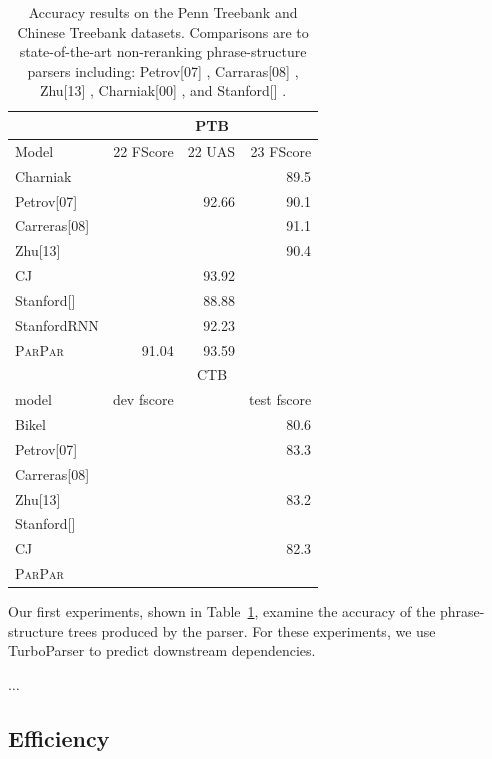 \documentclass[11pt,letterpaper]{article}
\newcommand{\ParseName}{\textsc{ParPar}}
\begin{document}
\begin{table}
  \centering
  \small
  \begin{tabular}{|l|rrr|}
    \hline
    & \multicolumn{3}{|c|}{PTB} \\
    \hline

    \hline
    Model & 22 FScore & 22 UAS & 23 FScore  \\
    \hline
    Charniak          & & & 89.5\\
    Petrov[07]        & & 92.66 & 90.1 \\
    Carreras[08]      & &  & 91.1 \\
    Zhu[13]           & &  & 90.4 \\
    CJ                & & 93.92 & \\
    Stanford[]        & & 88.88 & \\
    StanfordRNN       & & 92.23 & \\
    \ParseName & 91.04 & 93.59 & \\
    \hline
    \hline
    & \multicolumn{3}{|c|}{CTB} \\
    model &  dev fscore & & test fscore  \\
    \hline

    \hline
    Bikel         & & & 80.6 \\
    Petrov[07]    & & & 83.3 \\
    Carreras[08]  & & & \\
    Zhu[13]       & & & 83.2 \\
    Stanford[]    & & & \\
    CJ  & & & 82.3 \\
    \ParseName & & & \\
    \hline
  \end{tabular}
  \label{tab:acc}
  \caption{ Accuracy results on the Penn Treebank and Chinese Treebank datasets. Comparisons are to state-of-the-art non-reranking phrase-structure parsers including:  Petrov[07] \cite{petrov2006learning}, Carraras[08] \cite{carreras2008tag}, Zhu[13] \cite{zhu2013fast}, Charniak[00] \cite{charniak2000maximum}, and Stanford[] \cite{}.    }
\end{table}

Our first experiments, shown in Table~\ref{tab:acc}, examine the accuracy of the phrase-structure trees produced by the parser. For these experiments,
we use TurboParser \cite{martins2013turning} to predict downstream dependencies.

$\ldots$


\subsection{Efficiency}
\end{document}

